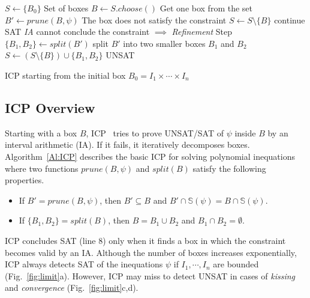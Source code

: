 \documentclass[runningheads,a4paper,oribibl]{llncs}
\begin{document}
\begin{algorithm}
\begin{algorithmic}[1]
\State $S \gets \{B_0\}$ \Comment Set of boxes
  \State $B \gets S.choose()$ \Comment Get one box from the set
  \State $B' \gets prune(B, \psi)$
   \Comment The box does not satisfy the constraint
  	\State $S \gets S \setminus \{B\}$
  	\State continue
  	\State \Return SAT
  \Else \Comment \emph{IA} cannot conclude the constraint $\implies$ \emph{Refinement} Step
  	\State $\{B_1, B_2\} \gets split(B')$ \Comment split $B'$ into two smaller boxes $B_1$ and $B_2$	
  	\State $S \gets (S \setminus \{B\}) \cup \{B_1, B_2\}$
  \EndIf
\EndWhile
\State \Return UNSAT
\end{algorithmic}
\caption{ICP starting from the initial box $B_0 = I_1 \times \cdots \times I_n$}
\label{Al:ICP}
\end{algorithm}


\subsection{ICP Overview}

\sloppy  
Starting with a box $B$, ICP~\cite{benhamou:hal-00480814} tries to prove
UNSAT/SAT of $\psi$ inside $B$ by an interval arithmetic (IA).
If it fails, it iteratively decomposes boxes.
Algorithm~\ref{Al:ICP} describes the basic ICP for solving polynomial inequations
where two functions $prune(B,\psi)$ and $split(B)$ satisfy the following properties.
\begin{itemize}
\item If $B' = prune (B, \psi)$,
  then $B' \subseteq B $ and $ B' \cap \mathbb{S}(\psi) = B \cap \mathbb{S}(\psi)$. 
\item If $\{B_1, B_2\} = split (B)$,
  then $B = B_1 \cup B_2$ and $B_1 \cap B_2 = \emptyset$. 
\end{itemize}

ICP concludes SAT (line 8) only when it finds a box
in which the constraint becomes valid by an IA. 
Although the number of boxes increases exponentially,
ICP always detects SAT of the inequations $\psi$
if $I_1, \cdots, I_n$ are bounded (Fig.~\ref{fig:limit}a). 
However, ICP may miss to detect UNSAT in cases of \emph{kissing} and
\emph{convergence} (Fig.~\ref{fig:limit}c,d).
\end{document}
